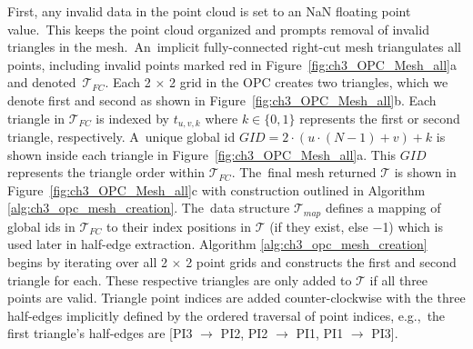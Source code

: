 First, any invalid data in the point cloud is set to an NaN floating point value.~This keeps the point cloud organized and prompts removal of invalid triangles in the mesh.~An~implicit fully-connected right-cut mesh triangulates all points, including invalid points marked red in Figure~\ref{fig:ch3_OPC_Mesh_all}a and denoted~$\mathcal{T}_{FC}$.  Each 2 $\times$ 2 grid in the \ac{OPC} creates two triangles, which we denote first and second as shown in Figure~\ref{fig:ch3_OPC_Mesh_all}b. Each triangle in $\mathcal{T}_{FC}$ is indexed by $t_{u,v,k}$ where  $k \in \{0,1\}$ represents the first or second triangle, respectively. A~unique global id $GID = 2 \cdot (u \cdot (N-1) + v) + k$ is shown inside each triangle in Figure~\ref{fig:ch3_OPC_Mesh_all}a. This $GID$ represents the triangle order within $\mathcal{T}_{FC}$.  The~final mesh returned $\mathcal{T}$ is shown in Figure~\ref{fig:ch3_OPC_Mesh_all}c with construction outlined in Algorithm \ref{alg:ch3_opc_mesh_creation}. The~data structure $\mathcal{T}_{map}$ defines a mapping of global ids in $\mathcal{T}_{FC}$ to their index positions in $\mathcal{T}$ (if they exist, else  $-$1) which is used later in half-edge extraction. Algorithm \ref{alg:ch3_opc_mesh_creation} begins by iterating over all 2 $\times$ 2 point grids and constructs the first and second triangle for each. These respective triangles are only added to $\mathcal{T}$ if all three points are valid. Triangle point indices are added counter-clockwise with the three half-edges implicitly defined by the ordered traversal of point indices, e.g.,~the first triangle's half-edges are [PI3 $\rightarrow$ PI2, PI2 $\rightarrow$ PI1, PI1 $\rightarrow$ PI3]. 








